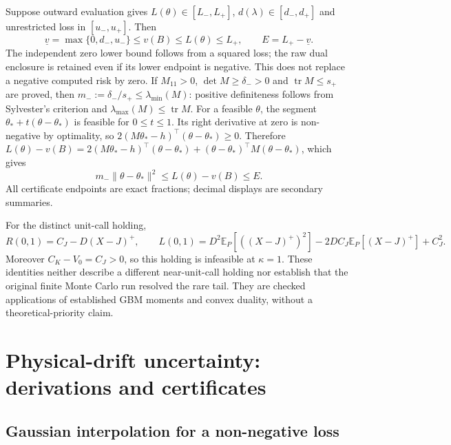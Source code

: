 \documentclass[11pt]{article}
\begin{document}
Suppose outward evaluation gives $L(\theta)\in[L_-,L_+]$,
$d(\lambda)\in[d_-,d_+]$ and unrestricted loss in $[u_-,u_+]$.
Then
\begin{equation}
 \underline v=\max\{0,d_-,u_-\}\leq v(B)\leq L(\theta)\leq L_+,
 \qquad E=L_+-\underline v.
 \label{eq:h-outward-value-gap}
\end{equation}
The independent zero lower bound follows from a squared loss; the raw
dual enclosure is retained even if its lower endpoint is negative.
This does not replace a negative computed risk by zero.
If $M_{11}>0$, $\det M\geq\delta_->0$ and
$\operatorname{tr}M\leq s_+$ are proved, then
$m_-:=\delta_-/s_+\leq\lambda_{\min}(M)$:
positive definiteness follows from Sylvester's criterion and
$\lambda_{\max}(M)\leq\operatorname{tr}M$.
For a feasible $\theta$, the segment
$\theta_*+t(\theta-\theta_*)$ is feasible for $0\leq t\leq1$.
Its right derivative at zero is non-negative by optimality, so
$2(M\theta_*-h)^\top(\theta-\theta_*)\geq0$. Therefore
$L(\theta)-v(B)=2(M\theta_*-h)^\top(\theta-\theta_*)
+(\theta-\theta_*)^\top M(\theta-\theta_*)$, which gives
\begin{equation}
 m_-\|\theta-\theta_*\|^2
 \leq L(\theta)-v(B)\leq E.
 \label{eq:h-outward-position-bound}
\end{equation}
All certificate endpoints are exact fractions; decimal displays are
secondary summaries.

For the distinct unit-call holding,
\begin{equation}
 R(0,1)=C_J-D(X-J)^+,\qquad
 L(0,1)=D^2\mathbb E_P[((X-J)^+)^2]
 -2DC_J\mathbb E_P[(X-J)^+]+C_J^2.
 \label{eq:h-unit-call-tail-risk}
\end{equation}
Moreover $C_K-V_0=C_J>0$, so this holding is infeasible at $\kappa=1$.
These identities neither describe a different near-unit-call holding nor
establish that the original finite Monte Carlo run resolved the rare tail.
They are checked applications of established GBM moments and convex
duality, without a theoretical-priority claim.

\section{Physical-drift uncertainty: derivations and certificates}
\label{app:h-drift}

\subsection{Gaussian interpolation for a non-negative loss}
\end{document}
